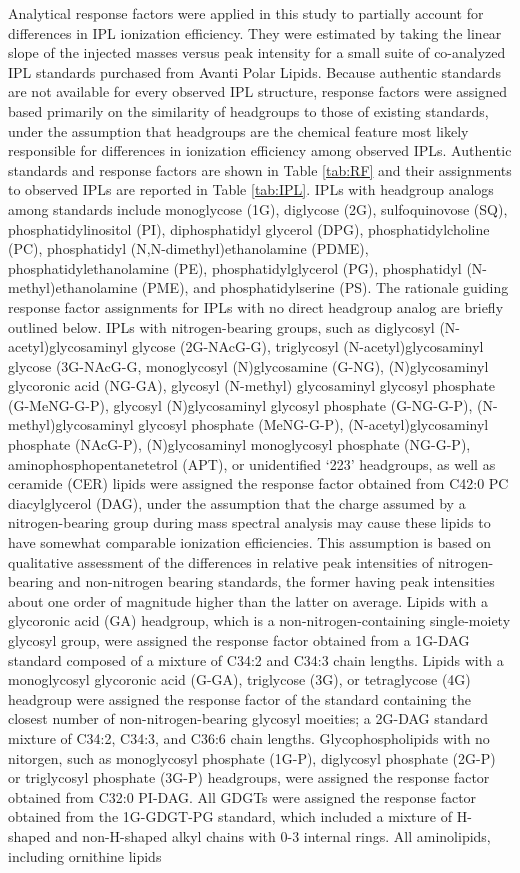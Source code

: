 Analytical response factors were applied in this study to partially account for differences in IPL ionization efficiency. They were estimated by taking the linear slope of the injected masses versus peak intensity for a small suite of co-analyzed IPL standards purchased from Avanti Polar Lipids. Because authentic standards are not available for every observed IPL structure, response factors were assigned based primarily on the similarity of headgroups to those of existing standards, under the assumption that headgroups are the chemical feature most likely responsible for differences in ionization efficiency among observed IPLs. Authentic standards and response factors are shown in Table \ref{tab:RF} and their assignments to observed IPLs are reported in Table \ref{tab:IPL}. IPLs with headgroup analogs among standards include monoglycose (1G), diglycose (2G), sulfoquinovose (SQ), phosphatidylinositol (PI), diphosphatidyl glycerol (DPG), phosphatidylcholine (PC), phosphatidyl (N,N-dimethyl)ethanolamine (PDME), phosphatidylethanolamine (PE), phosphatidylglycerol (PG), phosphatidyl (N-methyl)ethanolamine (PME), and phosphatidylserine (PS). The rationale guiding response factor assignments for IPLs with no direct headgroup analog are briefly outlined below. IPLs with nitrogen-bearing groups, such as diglycosyl (N-acetyl)glycosaminyl glycose (2G-NAcG-G), triglycosyl (N-acetyl)glycosaminyl glycose (3G-NAcG-G, monoglycosyl (N)glycosamine (G-NG), (N)glycosaminyl glycoronic acid (NG-GA), glycosyl (N-methyl) glycosaminyl glycosyl phosphate (G-MeNG-G-P), glycosyl (N)glycosaminyl glycosyl phosphate (G-NG-G-P), (N-methyl)glycosaminyl glycosyl phosphate (MeNG-G-P), (N-acetyl)glycosaminyl phosphate (NAcG-P), (N)glycosaminyl monoglycosyl phosphate (NG-G-P), aminophosphopentanetetrol (APT), or unidentified `223' headgroups, as well as ceramide (CER) lipids were assigned the response factor obtained from C42:0 PC diacylglycerol (DAG), under the assumption that the charge assumed by a nitrogen-bearing group during mass spectral analysis may cause these lipids to have somewhat comparable ionization efficiencies. This assumption is based on qualitative assessment of the differences in relative peak intensities of nitrogen-bearing and non-nitrogen bearing standards, the former having peak intensities about one order of magnitude higher than the latter on average. Lipids with a glycoronic acid (GA) headgroup, which is a non-nitrogen-containing single-moiety glycosyl group, were assigned the response factor obtained from a 1G-DAG standard composed of a mixture of C34:2 and C34:3 chain lengths. Lipids with a monoglycosyl glycoronic acid (G-GA), triglycose (3G), or tetraglycose (4G) headgroup were assigned the response factor of the standard containing the closest number of non-nitrogen-bearing glycosyl moeities; a 2G-DAG standard mixture of C34:2, C34:3, and C36:6 chain lengths. Glycophospholipids with no nitorgen, such as monoglycosyl phosphate (1G-P), diglycosyl phosphate (2G-P) or triglycosyl phosphate (3G-P) headgroups, were assigned the response factor obtained from C32:0 PI-DAG. All GDGTs were assigned the response factor obtained from the 1G-GDGT-PG standard, which included a mixture of H-shaped and non-H-shaped alkyl chains with 0-3 internal rings. All aminolipids, including ornithine lipids 